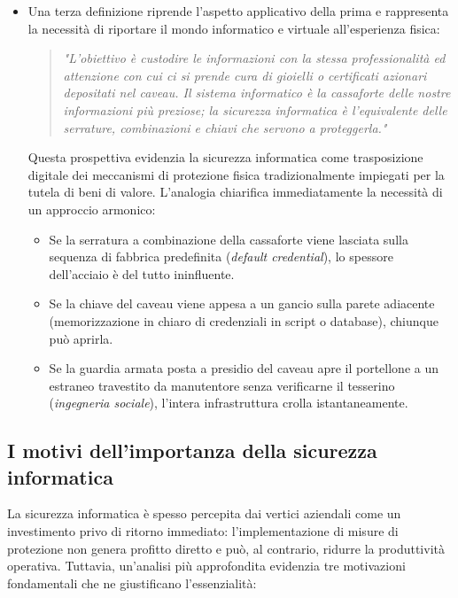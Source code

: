 \documentclass[../../main.tex]{subfiles}
\begin{document}
\begin{itemize}
    \item Una terza definizione riprende l'aspetto applicativo della prima e rappresenta la necessità di riportare il mondo informatico e virtuale all'esperienza fisica:
    \begin{quote}
    \textit{"L'obiettivo è custodire le informazioni con la stessa professionalità ed attenzione con cui ci si prende cura di gioielli o certificati azionari depositati nel caveau. Il sistema informatico è la cassaforte delle nostre informazioni più preziose; la sicurezza informatica è l'equivalente delle serrature, combinazioni e chiavi che servono a proteggerla."}
    \end{quote}
    Questa prospettiva evidenzia la sicurezza informatica come trasposizione digitale dei meccanismi di protezione fisica tradizionalmente impiegati per la tutela di beni di valore. L'analogia chiarifica immediatamente la necessità di un approccio armonico:
    \begin{itemize}
        \item Se la serratura a combinazione della cassaforte viene lasciata sulla sequenza di fabbrica predefinita (\textit{default credential}), lo spessore dell'acciaio è del tutto ininfluente.
        \item Se la chiave del caveau viene appesa a un gancio sulla parete adiacente (memorizzazione in chiaro di credenziali in script o database), chiunque può aprirla.
        \item Se la guardia armata posta a presidio del caveau apre il portellone a un estraneo travestito da manutentore senza verificarne il tesserino (\textit{ingegneria sociale}), l'intera infrastruttura crolla istantaneamente.
    \end{itemize}
\end{itemize}

\subsection{I motivi dell'importanza della sicurezza informatica}
\label{subsec:motivi_importanza}

La sicurezza informatica è spesso percepita dai vertici aziendali come un investimento privo di ritorno immediato: l'implementazione di misure di protezione non genera profitto diretto e può, al contrario, ridurre la produttività operativa. Tuttavia, un'analisi più approfondita evidenzia tre motivazioni fondamentali che ne giustificano l'essenzialità:
\end{document}
